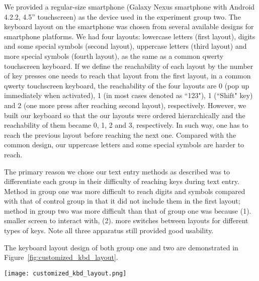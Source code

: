 \documentclass[conference]{IEEEtran}
\begin{document}
We provided a regular-size smartphone (Galaxy Nexus smartphone with Android 4.2.2, 4.5'' touchscreen) as the device used in the experiment group two. The keyboard layout on the smartphone was chosen from several available designs for smartphone platforms. We had four layouts: lowercase letters (first layout), digits and some special symbols (second layout), uppercase letters (third layout) and more special symbols (fourth layout), as the same as a common qwerty touchscreen keyboard. If we define the reachability of each layout by the number of key presses one needs to reach that layout from the first layout, in a common qwerty touchscreen keyboard, the reachability of the four layouts are 0 (pop up immediately when activated), 1 (in most cases denoted as ``123"), 1 (``Shift" key) and 2 (one more press after reaching second layout), respectively. However, we built our keyboard so that the our layouts were ordered hierarchically and the reachability of them became 0, 1, 2 and 3, respectively. In such way, one has to reach the previous layout before reaching the next one. Compared with the common design, our uppercase letters and some special symbols are harder to reach.

The primary reason we chose our text entry methods as described was to differentiate each group in their difficulty of reaching keys during text entry. Method in group one was more difficult to reach digits and symbols compared with that of control group in that it did not include them in the first layout; method in group two was more difficult than that of group one was because (1). smaller screen to interact with, (2). more switches between layouts for different types of keys. Note all three apparatus still provided good usability.

The keyboard layout design of both group one and two are demonstrated in Figure~\ref{fig:customized_kbd_layout}. 

\begin{figure*}
\texttt{[image: customized\_kbd\_layout.png]}
\caption{\label{fig:customized_kbd_layout} The keyboard layout for the devices in group one and two. Note two groups share the same key positions within each layout, but the structures of the four layouts are different: group one follows the common structure, while group two has a hierarchical structure, that is, to reach the next layout one has to first reach the previous one.}
\vspace{-6pt}\label{fig:customized_kbd_layout}
\end{figure*}
\end{document}
